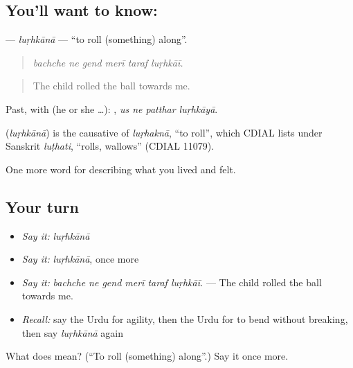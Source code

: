 \subsection*{You'll want to know: }
\textbf{} — \emph{luṛhkānā} — \textquotedblleft{}to roll (something) along\textquotedblright{}.

\begin{quote}
     
\end{quote}

\begin{quote}
\emph{bachche ne gend merī taraf luṛhkāī.}
\end{quote}

\begin{quote}
The child rolled the ball towards me.
\end{quote}

Past, with  (he or she …):    , \emph{us ne patthar luṛhkāyā}.

\begin{cousinweb}
\textbf{} (\emph{luṛhkānā}) is the causative of \emph{luṛhaknā}, \textquotedblleft{}to roll\textquotedblright{}, which CDIAL lists under Sanskrit \emph{luṭhati}, \textquotedblleft{}rolls, wallows\textquotedblright{} (CDIAL 11079).
\end{cousinweb}

\begin{grammarlens}[title={What you've built}]
One more word for describing what you lived and felt.
\end{grammarlens}

\subsection*{Your turn}
\begin{itemize}
\raggedright
  \item \emph{Say it:} \emph{luṛhkānā}
  \item \emph{Say it:} \emph{luṛhkānā}, once more
  \item \emph{Say it:} \emph{bachche ne gend merī taraf luṛhkāī.} — The child rolled the ball towards me.
  \item \emph{Recall:} say the Urdu for agility, then the Urdu for to bend without breaking, then say \emph{luṛhkānā} again
\end{itemize}

\begin{tcolorbox}[breakable,colback=teal!4,colframe=teal!35!black,title={Before you move on}]
What does  mean? (\textquotedblleft{}To roll (something) along\textquotedblright{}.) Say it once more.
\end{tcolorbox}
